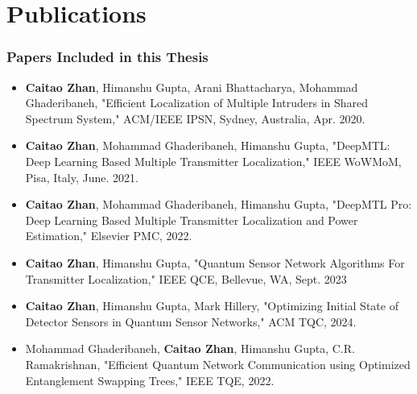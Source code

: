 \chapter{Publications}

\subsection*{Papers Included in this Thesis}
\begin{itemize}
    \item \textbf{Caitao Zhan}, Himanshu Gupta, Arani Bhattacharya, Mohammad Ghaderibaneh, "Efficient Localization of Multiple Intruders in Shared Spectrum System," ACM/IEEE IPSN, Sydney, Australia, Apr. 2020.

    \item \textbf{Caitao Zhan}, Mohammad Ghaderibaneh, Himanshu Gupta, "DeepMTL: Deep Learning Based Multiple Transmitter Localization," IEEE WoWMoM, Pisa, Italy, June. 2021. 

    \item \textbf{Caitao Zhan}, Mohammad Ghaderibaneh, Himanshu Gupta, "DeepMTL Pro: Deep Learning Based Multiple Transmitter Localization and Power Estimation," Elsevier PMC, 2022.

    \item \textbf{Caitao Zhan}, Himanshu Gupta, "Quantum Sensor Network Algorithms For Transmitter Localization," IEEE QCE, Bellevue, WA, Sept. 2023
    
    \item \textbf{Caitao Zhan}, Himanshu Gupta, Mark Hillery, "Optimizing Initial State of Detector Sensors in Quantum Sensor Networks," ACM TQC, 2024.

    \item Mohammad Ghaderibaneh, \textbf{Caitao Zhan}, Himanshu Gupta, C.R. Ramakrishnan, "Efficient Quantum Network Communication using Optimized Entanglement Swapping Trees," IEEE TQE, 2022.
\end{itemize}

